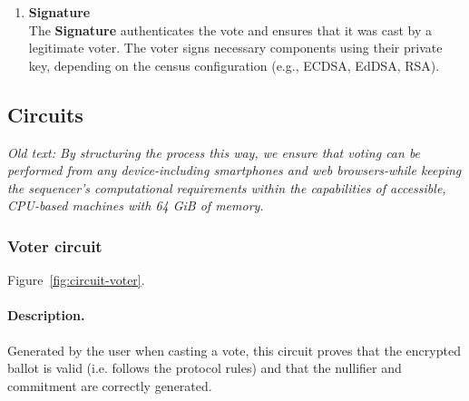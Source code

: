 \begin{enumerate}
	\begin{figure}[H]
		\centering
	\end{figure}
	
	\item \textbf{Signature}\\
	
	The \textbf{Signature} authenticates the vote and ensures that it was cast by a legitimate voter. The voter signs necessary components using their private key, depending on the census configuration (e.g., ECDSA, EdDSA, RSA).	
\end{enumerate}


\subsection{Circuits}
\label{sec:vocdoni-protocol:circuits}


\textit{Old text: By structuring the process this way, we ensure that voting can be performed from any device-including smartphones and web browsers-while keeping the sequencer's computational requirements within the capabilities of accessible, CPU-based machines with 64 GiB of memory.}





\subsubsection{Voter circuit}

Figure~\ref{fig:circuit-voter}.

\paragraph{Description.} Generated by the user when casting a vote, this circuit proves that the encrypted ballot is valid (i.e. follows the protocol rules) and that the nullifier and commitment are correctly generated.

